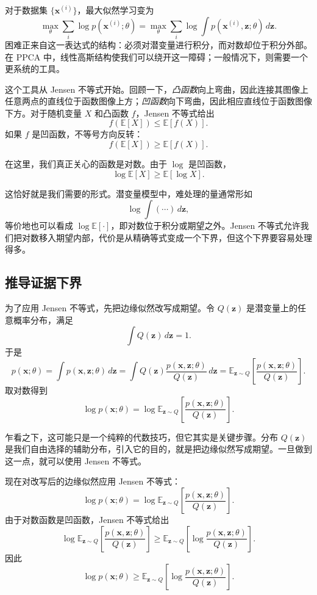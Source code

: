 对于数据集 \(\{\mathbf{x}^{(i)}\}\)，最大似然学习变为
\[
\max_\theta\sum_i\log p(\mathbf{x}^{(i)};\theta)
=
\max_\theta\sum_i\log\int p(\mathbf{x}^{(i)},\mathbf{z};\theta)\,d\mathbf{z}.
\]
困难正来自这一表达式的结构：必须对潜变量进行积分，而对数却位于积分外部。在 PPCA 中，线性高斯结构使我们可以绕开这一障碍；一般情况下，则需要一个更系统的工具。

这个工具从 Jensen 不等式开始。回顾一下，\emph{凸函数}向上弯曲，因此连接其图像上任意两点的直线位于函数图像上方；\emph{凹函数}向下弯曲，因此相应直线位于函数图像下方。对于随机变量 \(X\) 和凸函数 \(f\)，Jensen 不等式给出
\[
f(\mathbb{E}[X])\le\mathbb{E}[f(X)].
\]
如果 \(f\) 是凹函数，不等号方向反转：
\[
f(\mathbb{E}[X])\ge\mathbb{E}[f(X)].
\]

在这里，我们真正关心的函数是对数。由于 \(\log\) 是凹函数，
\[
\log\mathbb{E}[X]\ge\mathbb{E}[\log X].
\]

这恰好就是我们需要的形式。潜变量模型中，难处理的量通常形如
\[
\log\int(\cdots)\,d\mathbf{z},
\]
等价地也可以看成 \(\log\mathbb{E}[\cdot]\)，即对数位于积分或期望之外。Jensen 不等式允许我们把对数移入期望内部，代价是从精确等式变成一个下界，但这个下界要容易处理得多。

\subsection{推导证据下界}

为了应用 Jensen 不等式，先把边缘似然改写成期望。令 \(Q(\mathbf{z})\) 是潜变量上的任意概率分布，满足
\[
\int Q(\mathbf{z})\,d\mathbf{z}=1.
\]
于是
\[
p(\mathbf{x};\theta)
=
\int p(\mathbf{x},\mathbf{z};\theta)\,d\mathbf{z}
=
\int Q(\mathbf{z})
\frac{p(\mathbf{x},\mathbf{z};\theta)}{Q(\mathbf{z})}\,d\mathbf{z}
=
\mathbb{E}_{\mathbf{z}\sim Q}
\!\left[
\frac{p(\mathbf{x},\mathbf{z};\theta)}{Q(\mathbf{z})}
\right].
\]
取对数得到
\[
\log p(\mathbf{x};\theta)
=
\log
\mathbb{E}_{\mathbf{z}\sim Q}
\!\left[
\frac{p(\mathbf{x},\mathbf{z};\theta)}{Q(\mathbf{z})}
\right].
\]

乍看之下，这可能只是一个纯粹的代数技巧，但它其实是关键步骤。分布 \(Q(\mathbf{z})\) 是我们自由选择的辅助分布，引入它的目的，就是把边缘似然写成期望。一旦做到这一点，就可以使用 Jensen 不等式。

现在对改写后的边缘似然应用 Jensen 不等式：
\[
\log p(\mathbf{x};\theta)
=
\log
\mathbb{E}_{\mathbf{z}\sim Q}
\!\left[
\frac{p(\mathbf{x},\mathbf{z};\theta)}{Q(\mathbf{z})}
\right].
\]
由于对数函数是凹函数，Jensen 不等式给出
\[
\log
\mathbb{E}_{\mathbf{z}\sim Q}
\!\left[
\frac{p(\mathbf{x},\mathbf{z};\theta)}{Q(\mathbf{z})}
\right]
\ge
\mathbb{E}_{\mathbf{z}\sim Q}
\!\left[
\log
\frac{p(\mathbf{x},\mathbf{z};\theta)}{Q(\mathbf{z})}
\right].
\]
因此
\[
\log p(\mathbf{x};\theta)
\ge
\mathbb{E}_{\mathbf{z}\sim Q}
\!\left[
\log
\frac{p(\mathbf{x},\mathbf{z};\theta)}{Q(\mathbf{z})}
\right].
\]

